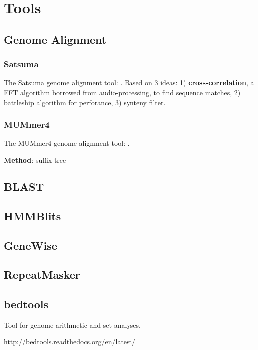 \section{Tools}

\subsection{Genome Alignment}

\subsubsection{Satsuma}

The Satsuma genome alignment tool: \cite{grabherr2010genome}. Based on 3 ideas:
1) \textbf{cross-correlation}, a FFT algorithm borrowed from audio-processing,
to find sequence matches, 2) battleship algorithm for perforance, 3) synteny
filter.

\subsubsection{MUMmer4}

The MUMmer4 genome alignment tool: \cite{marccais2018mummer4}.

\textbf{Method}: suffix-tree

\subsection{BLAST}

\subsection{HMMBlits}

\subsection{GeneWise}

\subsection{RepeatMasker}

\subsection{bedtools}

  Tool for genome arithmetic and set analyses.

  \url{http://bedtools.readthedocs.org/en/latest/}

